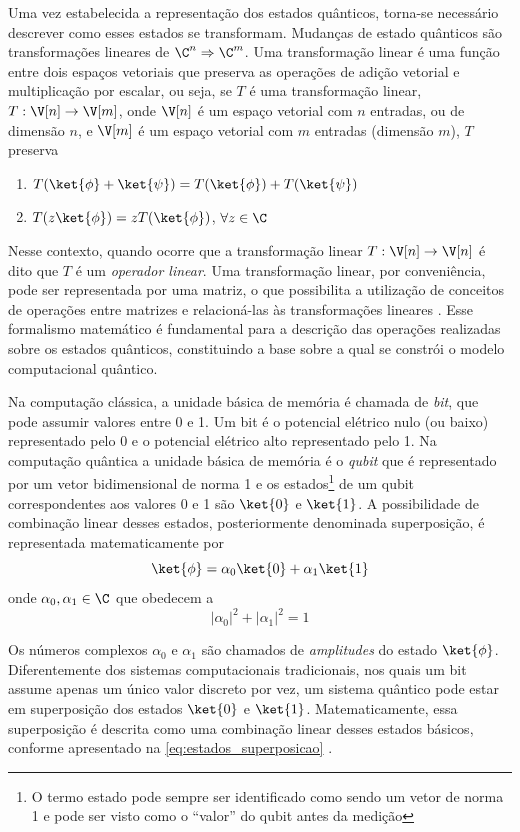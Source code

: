 Uma vez estabelecida a representação dos estados quânticos, torna-se necessário descrever como esses estados se transformam. Mudanças de estado quânticos são transformações lineares de $\C^n\Rightarrow \C^m$. Uma transformação linear é uma função entre dois espaços vetoriais que preserva as operações de adição vetorial e multiplicação por escalar, ou seja, se $T$ é uma transformação linear, $T:\V[n]\rightarrow\V[m]$, onde $\V[n]$ é um espaço vetorial com $n$ entradas, ou de dimensão $n$, e $\V[m]$ é um espaço vetorial com $m$ entradas (dimensão $m$), $T$ preserva
\begin{enumerate}
    \item $T(\ket{\phi}+\ket{\psi}) = T(\ket{\phi})+T(\ket{\psi})$
    \item $T(z\ket{\phi})=zT(\ket{\phi})$, $\forall z\in\C$
\end{enumerate}

Nesse contexto, quando ocorre que a transformação linear $T:\V[n]\rightarrow\V[n]$ é dito que $T$ é um \textit{operador linear}. Uma transformação linear, por conveniência, pode ser representada por uma matriz, o que possibilita a utilização de conceitos de operações entre matrizes e relacioná-las às transformações lineares \cite{dettman1986introduction}. Esse formalismo matemático é fundamental para a descrição das operações realizadas sobre os estados quânticos, constituindo a base sobre a qual se constrói o modelo computacional quântico.

Na computação clássica, a unidade básica de memória é chamada de \textit{bit}, que pode assumir valores entre 0 e 1. Um bit é o potencial elétrico nulo (ou baixo) representado pelo 0 e o potencial elétrico alto representado pelo 1. Na computação quântica a unidade básica de memória é o \textit{qubit} que é representado por um vetor bidimensional de norma 1 e os estados\footnote{O termo estado pode sempre ser identificado como sendo um vetor de norma 1 e pode ser visto como o ``valor'' do qubit antes da medição} de um qubit correspondentes aos valores 0 e 1 são $\ket{0}$ e $\ket{1}$. A possibilidade de combinação linear desses estados, posteriormente denominada superposição, é representada matematicamente por
    \begin{equation}
        \label{eq:estados_superposicao}
        \ket{\phi}=\alpha_0\ket{0}+\alpha_1\ket{1}
    \end{equation}
    onde $\alpha_0, \alpha_1\in\C$ que obedecem a
    $$
        |\alpha_0|^2+|\alpha_1|^2=1
    $$
    
Os números complexos $\alpha_0$ e $\alpha_1$ são chamados de \textit{amplitudes} do estado $\ket{\phi}$. Diferentemente dos sistemas computacionais tradicionais, nos quais um bit assume apenas um único valor discreto por vez, um sistema quântico pode estar em superposição dos estados $\ket{0}$ e $\ket{1}$. Matematicamente, essa superposição é descrita como uma combinação linear desses estados básicos, conforme apresentado na \autoref{eq:estados_superposicao} \cite[pág. 13]{nielsen_quantum_2002}.
    
